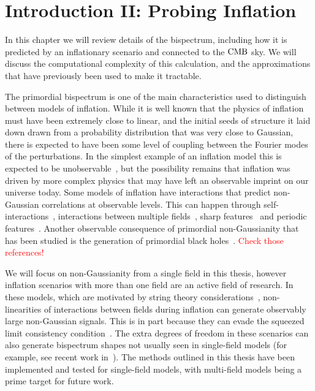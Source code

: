%
\chapter{Introduction II: Probing Inflation}\label{chapter:intro_bispectra}
In this chapter we will review details of the bispectrum, including how it is predicted
by an inflationary scenario and connected to the $\text{CMB}$ sky.
We will discuss the computational complexity of this calculation, and
the approximations that have previously been used to make it tractable.


The primordial bispectrum is one of the main
characteristics used to distinguish between models of inflation. While it is well
known that the physics of inflation must have been extremely close
to linear, and the initial seeds of structure it laid down
drawn from a probability distribution that was
very close to Gaussian, there is expected to have been some level of coupling
between the Fourier modes of the perturbations.
In the simplest example of an inflation model this is
expected to be unobservable~\cite{Maldacena},
but the possibility remains that inflation was driven by
more complex physics that may have left an observable imprint on our universe today.
Some models of inflation have interactions that predict non-Gaussian
correlations at observable levels. This can happen through
self-interactions~\cite{px_burrage,dbi_in_the_sky},
interactions between multiple fields~\cite{Byrnes_2010, Gao_turn,
achucarro_multifield1, achucarro_multifield2, achucarro_robust_16, achucarro_natural,
achucarro_quad_viability, achucarro_gsr_cs_14, achucarro_cs_reduction_13,
achucarro_gong_cs_corr, achucarro_cs_12, achucarro_eft, curvaton_comprehensive},
sharp features~\cite{adshead, gsr, step_novaes}
and periodic features~\cite{flauger_pajer_resonant, Pajer_2013, Meerburg_2012, Meerburg_osc, Meerburg_2010,
Barnaby_2011, Peiris_2013, Easther_2013, Cabass_2018, Behbahani_2011}.
Another observable consequence of primordial non-Gaussianity
that has been studied is the generation of primordial black
holes~\cite{pbh_byrnes, pbh_young, pbh_franciolini, pbh_passaglia}.
\textcolor{red}{Check those references!}


We will focus on non-Gaussianity from a single field in this thesis,
however inflation scenarios with more than one field are an
active field of research.
In these models, which are motivated by string theory considerations~\cite{achucarro_multifield1},
non-linearities of interactions between fields during inflation
can generate observably large non-Gaussian signals.
This is in part because they can evade the squeezed limit consistency condition~\cite{sqz_consistency}.
The extra degrees of freedom in these scenarios can also generate bispectrum shapes not usually
seen in single-field models (for example, see recent work in~\cite{RP_2, Fumagalli_2019}).
The methods outlined in this thesis have been implemented
and tested for single-field models,
with multi-field models being a prime target for future work.


